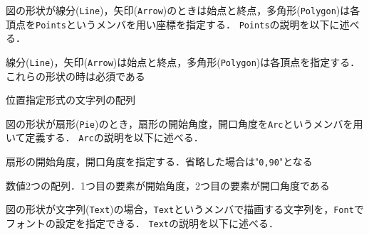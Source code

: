 図の形状が線分({\tt Line})，矢印({\tt Arrow})のときは始点と終点，多角形({\tt Polygon})は各頂点を{\tt Points}というメンバを用い座標を指定する．
{\tt Points}の説明を以下に述べる．

\begin{description}
{\nopagebreak
\item[\texttt{Points}] \mbox{}
    \vspace{-1zw}
    \begin{description}
    \setlength{\itemsep}{-1.5\itemsep}
    \item[説明] 線分({\tt Line})，矢印({\tt Arrow})は始点と終点，多角形({\tt Polygon})は各頂点を指定する．これらの形状の時は必須である
    \item[値] 位置指定形式の文字列の配列
    \end{description}
}
\end{description}

図の形状が扇形({\tt Pie})のとき，扇形の開始角度，開口角度を{\tt Arc}というメンバを用いて定義する．
{\tt Arc}の説明を以下に述べる．

\begin{description}
{\nopagebreak
\item[\texttt{Arc}] \mbox{}
    \vspace{-1zw}
    \begin{description}
    \setlength{\itemsep}{-1.5\itemsep}
    \item[説明] 扇形の開始角度，開口角度を指定する．省略した場合は"{\tt 0,90}"となる
    \item[値] 数値2つの配列．1つ目の要素が開始角度，2つ目の要素が開口角度である
    \end{description}
}
\end{description}

図の形状が文字列({\tt Text})の場合，{\tt Text}というメンバで描画する文字列を，{\tt Font}でフォントの設定を指定できる．
{\tt Text}の説明を以下に述べる．

